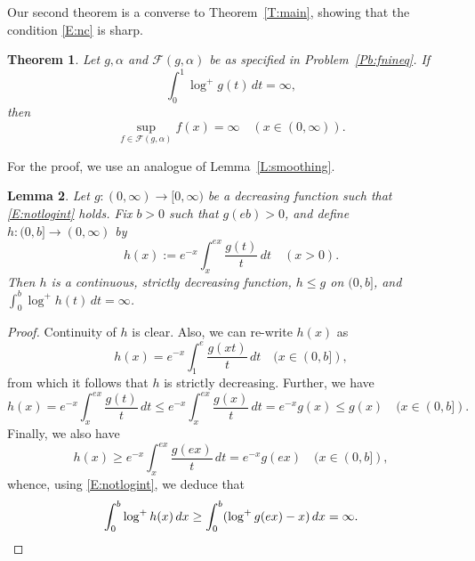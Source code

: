 \documentclass[11pt,reqno]{amsart}
\theoremstyle{plain}
\newtheorem{theorem}{Theorem}[section]
\newtheorem{lemma}[theorem]{Lemma}
\theoremstyle{definition}
\theoremstyle{remark}
\newcommand{\cF}{\mathcal{F}}
\begin{document}
Our second theorem is a converse to Theorem~\ref{T:main},
showing that the condition \eqref{E:nc} is sharp.

\begin{theorem}\label{T:converse}
Let $g,\alpha$ and $\cF(g,\alpha)$ be as specified in Problem~\ref{Pb:fnineq}. 
If
\begin{equation}\label{E:notlogint}
\int_0^1 \log^+ g(t)\,dt=\infty,
\end{equation}
then
\begin{equation}\label{E:Finfinite}
\sup_{f\in\cF(g,\alpha)}f(x)=\infty
\quad(x\in(0,\infty)).
\end{equation}
\end{theorem}

For the proof, we use an analogue of Lemma~\ref{L:smoothing}.

\begin{lemma}\label{L:roughing}
Let $g:(0,\infty)\to[0,\infty)$ be a decreasing function
such that \eqref{E:notlogint} holds.
Fix $b>0$ such that $g(eb)>0$, and define
$h:(0,b]\to(0,\infty)$ by
\[
h(x):=e^{-x}\int_x^{ex}\frac{g(t)}{t}\,dt
\quad(x>0).
\]
Then $h$ is a continuous, strictly decreasing
function,  $h\le g$ on $(0,b]$, and
$\int_0^b\log^+h(t)\,dt=\infty$.
\end{lemma}

\begin{proof}
Continuity of $h$ is clear. Also, we can re-write $h(x)$ as 
\[
h(x)=e^{-x}\int_1^e \frac{g(xt)}{t}\,dt \quad(x\in(0,b]),
\]
from which it follows that $h$ is strictly decreasing. Further,
we have
\[
h(x)= e^{-x}\int_x^{ex}\frac{g(t)}{t}\,dt
\le e^{-x}\int_x^{ex} \frac{g(x)}{t}\,dt=e^{-x}g(x)\le g(x) \quad(x\in(0,b]).
\]
Finally, we also have
\[
h(x)
\ge e^{-x}\int_x^{ex} \frac{g(ex)}{t}\,dt=e^{-x}g(ex)
\quad(x\in(0,b]),
\]
whence, using \eqref{E:notlogint}, we deduce that
\[
\int_0^b\log^+ h(x)\,dx\ge \int_0^b (\log^+ g(ex)-x)\,dx=\infty.\qedhere
\]
\end{proof}
\end{document}
